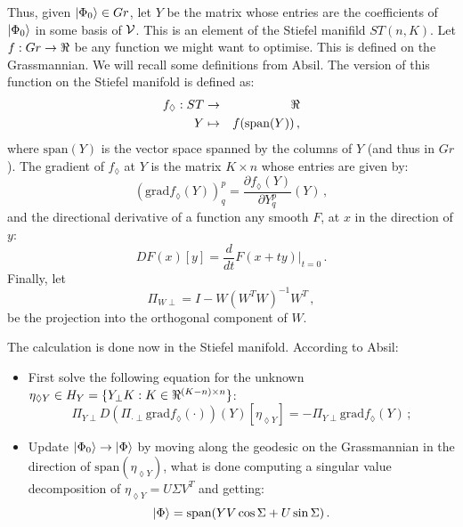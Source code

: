 Thus, given $\ket{\Phi_0} \in Gr$, let $Y$ be the matrix whose entries are the coefficients of $\ket{\Phi_0}$ in some basis of $\mathcal{V}{}$.
This is an element of the Stiefel manifild $ST(n,K)$.
Let $f : Gr \to \real$ be any function we might want to optimise.
This is defined on the Grassmannian.
We will recall some definitions from Absil.\cite{}
The version of this function on the Stiefel manifold is defined as:
\begin{eqnarray}
  f_{\lozenge} : ST &\to& \real\\
  Y &\mapsto& f(\text{span}(Y))\,,
\end{eqnarray}
where $\text{span}(Y)$ is the vector space spanned by the columns of $Y$ (and thus in $Gr$).
The gradient of $f_\lozenge$ at $Y$ is the matrix $K \times n$ whose entries are given by:
\begin{equation}
(\text{grad} f_\lozenge(Y))^p_q = \frac{\partial f_\lozenge(Y)}{\partial Y^p_q}(Y)\,,
\end{equation}
and the directional derivative of a function any smooth $F$, at $x$ in the direction of $y$:
\begin{equation}
  DF(x)[y] = \frac{d}{dt}F(x + ty)\big|_{t=0}\,.
\end{equation}
Finally, let
\begin{equation}
  \Pi_{W\perp} = I - W(W^TW)^{-1}W^T\,,
\end{equation}
be the projection into the orthogonal component of $W$.

The calculation is done now in the Stiefel manifold.
According to Absil:
\begin{itemize}
\item First solve the following equation for the unknown $\eta_{\lozenge Y} \in H_Y = \{Y_\perp K:K \in \real^{(K-n)\times n}\}$:
  \begin{equation}\label{eq:Absil_main_eq}
    \Pi_{Y\perp} D\left(\Pi_{\cdot{} \perp} \text{grad}f_\lozenge\left(\cdot{}\right) \right)
    \left(Y\right)\left[\eta_{\lozenge Y}\right] = -\Pi_{Y\perp}\text{grad}f_\lozenge\left(Y\right)\,;
  \end{equation}
\item Update $\ket{\Phi_0} \to \ket{\Phi}$ by moving along the geodesic on the Grassmannian in the direction of $\text{span}(\eta_{\lozenge Y})$, what is done computing a singular value decomposition of $\eta_{\lozenge Y} = U \Sigma V^T$ and getting:
  \begin{equation}
    \ket{\Phi} = \text{span}(Y V \cos \Sigma + U \sin \Sigma)\,.
  \end{equation}
\end{itemize}

